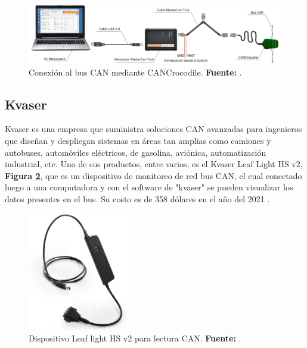 \begin{figure}[H]
	\centering
	\includegraphics[width=1.0\textwidth]{./Cap3imagen/esquemaMasterCAN.png}
	\caption[ Conexión al bus CAN mediante CANCrocodile.]{ Conexión al bus CAN mediante CANCrocodile.\textbf{ Fuente:} \cite{cite_mastertool_c3}.}
	\label{fig_sistemacocodrile_c3} %
\end{figure}

\subsection{Kvaser}
Kvaser es una empresa que suministra soluciones CAN avanzadas para ingenieros que diseñan y despliegan sistemas en áreas tan amplias como camiones y autobuses, automóviles eléctricos, de gasolina, aviónica,  automatización industrial, etc. Uno de sus productos, entre varios, es el  Kvaser Leaf Light HS v2, \textbf{Figura \ref{fig_kvaserLeafLight_c3}},  que es un dispositivo de monitoreo de red bus CAN, el cual conectado luego a una computadora y con el software de "kvaser"  se pueden visualizar los datos presentes en el bus.  Su costo es de 358 dólares en el año del 2021 \cite{cite_kvaserLeaf_c3}.


\begin{figure}[H]
	\centering
	\includegraphics[width=0.4\textwidth]{./Cap3imagen/kvaserLeafLight.jpg}
	\caption[ Dispositivo Leaf light HS v2 para lectura CAN.]{Dispositivo Leaf light HS v2 para lectura CAN.\textbf{ Fuente:} \cite{cite_kvaserLeaf_c3}.}
	\label{fig_kvaserLeafLight_c3} %
\end{figure}

